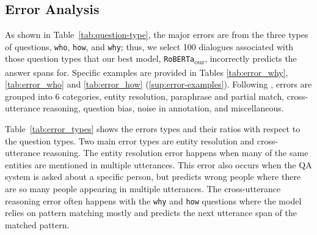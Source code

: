 \documentclass[11pt,a4paper]{article}
\newcommand{\textsec}[1]{\textsection\ref{#1}}
\newcommand{\LN}{\linebreak\noindent}
\begin{document}
\subsection{Error Analysis}

As shown in Table~\ref{tab:question-type}, the major errors are from the three types of questions, \texttt{who}, \texttt{how}, and \texttt{why}; thus, we select 100 dialogues associated with those question types that our best model, \texttt{RoBERTa}\textsubscript{our}, incorrectly predicts the answer spans for.
Specific examples are provided in Tables \ref{tab:error_why}, \ref{tab:error_who} and \ref{tab:error_how} (\textsec{sup:error-examples}).\LN
Following \citet{yang_2019a}, errors are grouped into 6 categories, entity resolution, paraphrase and partial match, cross-utterance reasoning, question bias, noise in annotation, and miscellaneous.

\noindent Table~\ref{tab:error_types} shows the errors types and their ratios with respect to the question types.
Two main error types are entity resolution and cross-utterance reasoning.
The entity resolution error happens when many of the same entities are mentioned in multiple utterances. 
This error also occurs when the QA system is asked about a specific person, but predicts wrong people where there are so many people appearing in multiple utterances. 
The cross-utterance reasoning error often happens with the \texttt{why} and \texttt{how} questions where the model relies on pattern matching mostly and predicts the next utterance span of the matched pattern.
\end{document}
